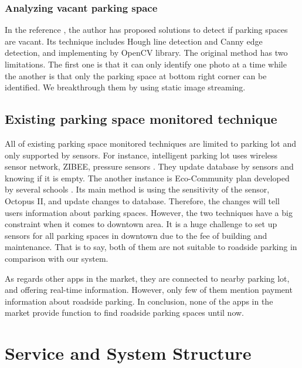 \documentclass[runningheads,a4paper]{llncs}
\begin{document}
\begin{CJK}{UTF8}{bsmi}
%
\subsubsection{Analyzing vacant parking space}
%

In the reference \cite{ParkingSpot}, the author has proposed solutions to detect if
parking spaces are vacant. Its technique includes Hough line detection
and Canny edge detection, and implementing by OpenCV library. The
original method has two limitations. The first one is that it can only
identify one photo at a time while the another is that only the parking
space at bottom right corner can be identified. We breakthrough them by
using static image streaming.

%
\subsection{Existing parking space monitored technique}
%

All of existing parking space monitored techniques are limited to
parking lot and only supported by sensors. For instance, intelligent
parking lot uses wireless sensor network, ZIBEE, pressure sensors
\cite{PaymentSystem}.
They update database by sensors and knowing if it is empty. The another
instance is Eco-Community plan developed by several schools
\cite{EcoCommunity}. Its
main method is using the sensitivity of the sensor, Octopus II, and
update changes to database. Therefore, the changes will tell users
information about parking spaces. However, the two techniques have a big
constraint when it comes to downtown area. It is a huge challenge to set
up sensors for all parking spaces in downtown due to the fee of building
and maintenance. That is to say, both of them are not suitable to
roadside parking in comparison with our system.

As regards other apps in the market, they are connected to nearby
parking lot, and offering real-time information. However, only few of
them mention payment information about roadside parking. In conclusion,
none of the apps in the market provide function to find roadside parking
spaces until now.

\section{Service and System Structure}\label{sec:service}


\end{CJK}
\end{document}
